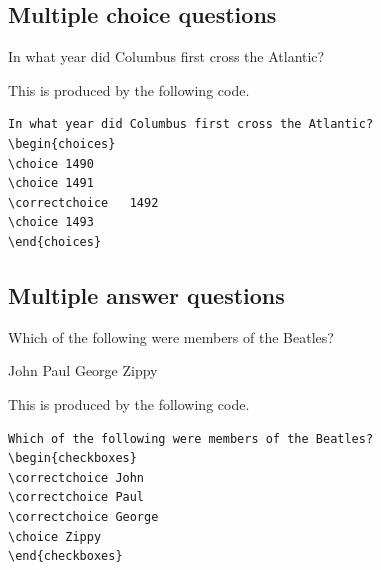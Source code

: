 \documentclass{article}
\theoremstyle{break}
\begin{document}
\subsection{Multiple choice questions}

In what year did Columbus first cross the Atlantic?
\begin{choices}
\end{choices}

This is produced by the following code.
\begin{Verbatim}[frame=single]
In what year did Columbus first cross the Atlantic?
\begin{choices}
\choice 1490 
\choice 1491 
\correctchoice   1492 
\choice 1493 
\end{choices}
\end{Verbatim}

\subsection{Multiple answer questions}

Which of the following were members of the Beatles?
\begin{checkboxes}
\correctchoice John
\correctchoice Paul
\correctchoice George
\choice Zippy
\end{checkboxes}

This is produced by the following code.
\begin{Verbatim}[frame=single]
Which of the following were members of the Beatles?
\begin{checkboxes}
\correctchoice John
\correctchoice Paul
\correctchoice George
\choice Zippy
\end{checkboxes}
\end{Verbatim}
\end{document}
